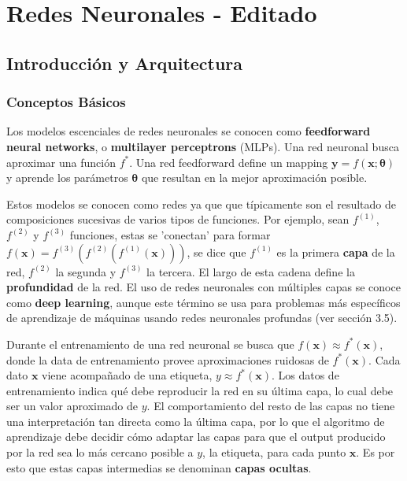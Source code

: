 
\newpage
\section{Redes Neuronales - Editado}

\subsection{Introducci\'on y Arquitectura}

\subsubsection{Conceptos B\'asicos}

Los modelos escenciales de redes neuronales se conocen como \textbf{feedforward neural networks}, o \textbf{multilayer perceptrons} (MLPs). Una red neuronal busca aproximar una funci\'on $f^*$. Una red feedforward define un mapping $\bm{y}=f(\bm{x}; \bm{\theta})$ y aprende los par\'ametros $\bm{\theta}$ que resultan en la mejor aproximaci\'on posible.

Estos modelos se conocen como redes ya que que t\'ipicamente son el resultado de composiciones sucesivas de varios tipos de funciones. Por ejemplo, sean $f^{(1)}$, $f^{(2)}$ y $f^{(3)}$ funciones, estas se 'conectan' para formar $f(\bm{x}) = f^{(3)}(f^{(2)}(f^{(1)}(\bm{x})))$, se dice que $f^{(1)}$ es la primera \textbf{capa} de la red, $f^{(2)}$ la segunda y $f^{(3)}$ la tercera. El largo de esta cadena define la \textbf{profundidad} de la red. El uso de redes neuronales con m\'ultiples capas se conoce como \textbf{deep learning}, aunque este t\'ermino se usa para problemas m\'as espec\'ificos de aprendizaje de m\'aquinas usando redes neuronales profundas (ver secci\'on 3.5).

Durante el entrenamiento de una red neuronal se busca que $f(\bm{x}) \approx f^*(\bm{x})$, donde la data de entrenamiento provee aproximaciones ruidosas de $f^*(\bm{x})$. Cada dato $\bm{x}$ viene acompa{\~{n}}ado de una etiqueta, $y \approx f^*(\bm{x})$. Los datos de entrenamiento indica qu\'e debe reproducir la red en su \'ultima capa, lo cual debe ser un valor aproximado de $y$. El comportamiento del resto de las capas no tiene una interpretación tan directa como la última capa, por lo que el algoritmo de aprendizaje debe decidir c\'omo adaptar las capas para que el output producido por la red sea lo m\'as cercano posible a $y$, la etiqueta, para cada punto $\bm{x}$. Es por esto que estas capas intermedias se denominan \textbf{capas ocultas}.

